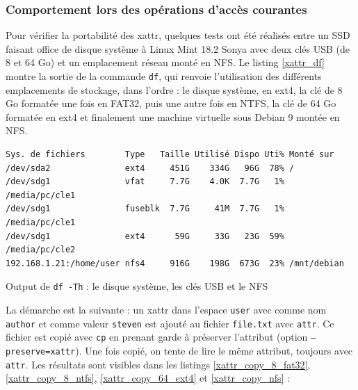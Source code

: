 \subsubsection{Comportement lors des opérations d'accès courantes}
Pour vérifier la portabilité des \acrshort{xattr}, quelques tests ont été réalisés entre un 
SSD faisant office de disque système à Linux Mint 18.2 Sonya avec deux clés USB (de 8 et 64 Go) et un emplacement 
réseau monté en NFS. Le listing \ref{xattr_df} montre la sortie de la commande \texttt{df}, qui 
renvoie l'utilisation des différents emplacements de stockage, dans l'ordre : le disque système, en 
ext4, la clé de 8 Go formatée une fois en FAT32, puis une autre fois en NTFS, la clé de 64 Go formatée 
en ext4 et finalement une machine virtuelle sous Debian 9 montée en NFS.
\bigbreak
\begin{code}
    \begin{verbatim}
Sys. de fichiers        Type   Taille Utilisé Dispo Uti% Monté sur
/dev/sda2               ext4     451G    334G   96G  78% /
/dev/sdg1               vfat     7.7G    4.0K  7.7G   1% /media/pc/cle1
/dev/sdg1               fuseblk  7.7G     41M  7.7G   1% /media/pc/cle1
/dev/sdg1               ext4      59G     33G   23G  59% /media/pc/cle2
192.168.1.21:/home/user nfs4     916G    198G  673G  23% /mnt/debian
    \end{verbatim}
    \caption{Output de \texttt{df -Th} : le disque système, les clés USB et le NFS}
    \label{xattr_df}
\end{code}
\bigbreak
La démarche est la suivante : un \acrshort{xattr} dans l'espace \texttt{user} avec 
comme nom \texttt{author} et comme valeur \texttt{steven} est ajouté au fichier 
\texttt{file.txt} avec \texttt{attr}. Ce fichier est copié avec 
\texttt{cp} en prenant garde à préserver l'attribut (option 
\texttt{--preserve=xattr}). Une fois copié, on tente de lire le même attribut, toujours 
avec \texttt{attr}. Les résultats sont visibles dans les listings \ref{xattr_copy_8_fat32}, 
\ref{xattr_copy_8_ntfs}, \ref{xattr_copy_64_ext4} et \ref{xattr_copy_nfs} :
\bigbreak
{}
